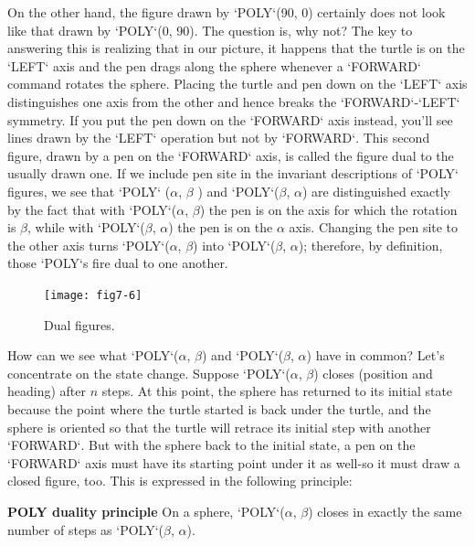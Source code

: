 \documentclass{book}
\begin{document}
On the other hand, the figure drawn by \textsc{`POLY`}(90, 0) certainly does not
look like that drawn by \textsc{`POLY`}(0, 90). The question is, why not? The
key to answering this is realizing that in our picture, it happens that the
turtle is on the \textsc{`LEFT`} axis and the pen drags along the sphere whenever a
\textsc{`FORWARD`} command rotates the sphere. Placing the turtle and pen down
on the \textsc{`LEFT`} axis distinguishes one axis from the other and hence breaks
the \textsc{`FORWARD`}-\textsc{`LEFT`} symmetry. If you put the pen down on the \textsc{`FORWARD`}
axis instead, you'll see lines drawn by the \textsc{`LEFT`} operation but not by
\textsc{`FORWARD`}. This second figure, drawn by a pen on the \textsc{`FORWARD`} axis, is
called the figure dual to the usually drawn one. If we include pen site in
the invariant descriptions of \textsc{`POLY`} figures, we see that \textsc{`POLY`} ($\alpha$, $\beta$ ) and
\textsc{`POLY`}($\beta$, $\alpha$) are distinguished exactly by the fact that with \textsc{`POLY`}($\alpha$, $\beta$)
the pen is on the axis for which the rotation is $\beta$, while with \textsc{`POLY`}($\beta$, $\alpha$)
the pen is on the $\alpha$ axis. Changing the pen site to the other axis turns
\textsc{`POLY`}($\alpha$, $\beta$) into \textsc{`POLY`}($\beta$, $\alpha$); therefore, by definition, those \textsc{`POLY`}s fire
dual to one another.

\begin{figure}
\begin{center}
\texttt{[image: fig7-6]}
\caption{Dual figures.}
\end{center}
\end{figure}

How can we see what \textsc{`POLY`}($\alpha$, $\beta$) and \textsc{`POLY`}($\beta$, $\alpha$) have in common?
Let's concentrate on the state change. Suppose \textsc{`POLY`}($\alpha$, $\beta$) closes 
(position and heading) after $n$ steps. At this point, the sphere has returned to
its initial state because the point where the turtle started is back under
the turtle, and the sphere is oriented so that the turtle will retrace its
initial step with another \textsc{`FORWARD`}. But with the sphere back to the initial
state, a pen on the \textsc{`FORWARD`} axis must have its starting point under it
as well-so it must draw a closed figure, too. This is expressed in the
following principle:

\textbf{POLY duality principle} On a sphere, \textsc{`POLY`}($\alpha$, $\beta$) closes in exactly the
same number of steps as \textsc{`POLY`}($\beta$, $\alpha$).
\end{document}
